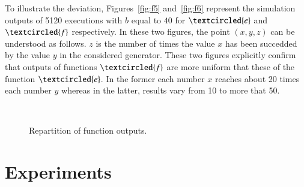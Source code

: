 



To illustrate the deviation, Figures~\ref{fig:f5} and~\ref{fig:f6} represent
the simulation outputs of 5120 executions with  $b$ equal to $40$
for $\textcircled{e}$ and $\textcircled{f}$ respectively.
In these two figures, the point $(x,y,z)$ can be understood as follows.
$z$ is the number of times the value $x$ has been succedded by the value $y$ in the 
considered generator.
These two figures explicitly confirm that outputs of functions $\textcircled{f}$ are 
more uniform that these of the function $\textcircled{e}$. 
In the former each number $x$ reaches about 20 times each number $y$ whereas
in the latter, results vary from 10 to more that 50. 

\begin{figure}
\centering
$\qquad$
\caption{Repartition of function outputs.} \label{fig:fs}
\end{figure}




\section{Experiments}


